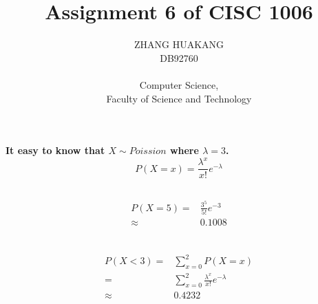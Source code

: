 \documentclass{article}
\title{Assignment 6 of CISC 1006}
\author{ZHANG HUAKANG \\ DB92760 \\ \\ Computer Science, \\Faculty of Science and Technology}
\begin{document}
    \maketitle
    \section{}
        \paragraph{
            It easy to know that $X\sim Poission$ where $\lambda=3$.
            $$P(X=x)=\frac{\lambda^x}{x!}e^{-\lambda}$$
        }
        \subsection{}
            \paragraph{
                \begin{equation*}
                    \begin{split}
                        P(X=5)=&\frac{3^5}{5!}e^{-3}\\
                            \approx&0.1008\\
                    \end{split}
                \end{equation*}
            }
        \subsection{}
            \paragraph{
                \begin{equation*}
                    \begin{split}
                        P(X<3)=&\sum_{x=0}^2 P(X=x)\\
                            =&\sum_{x=0}^2 \frac{\lambda^x}{x!}e^{-\lambda}\\
                            \approx&0.4232
                    \end{split}
                \end{equation*}
            }
        \subsection{}
\end{document}
